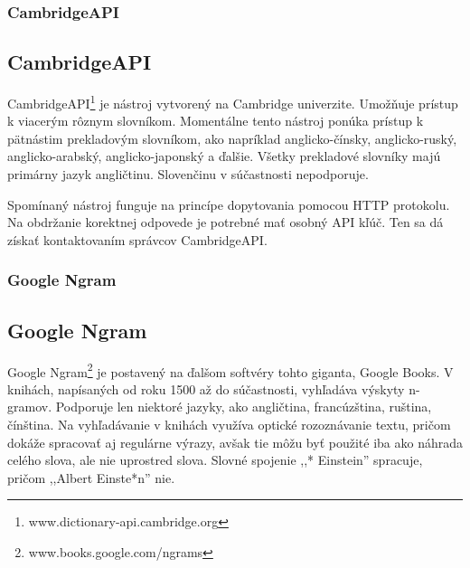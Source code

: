 %
%
{
	\subsubsection{CambridgeAPI}
}
{
	\subsection{CambridgeAPI}
}
\label{subsubsec:cambridgeapi}
CambridgeAPI\footnote{www.dictionary-api.cambridge.org} je nástroj vytvorený na Cambridge univerzite. Umožňuje prístup k viacerým rôznym slovníkom. Momentálne tento nástroj ponúka prístup k pätnástim prekladovým slovníkom, ako napríklad anglicko-čínsky, anglicko-ruský, anglicko-arabský, anglicko-japonský a ďalšie. Všetky prekladové slovníky majú primárny jazyk angličtinu. Slovenčinu v súčastnosti nepodporuje.

Spomínaný nástroj funguje na princípe dopytovania pomocou HTTP protokolu. Na obdržanie korektnej odpovede je potrebné mať osobný API kľúč. Ten sa dá získať kontaktovaním správcov CambridgeAPI.

%
%
{
	\subsubsection{Google Ngram}
}
{
	\subsection{Google Ngram}
}
\label{subsubsec:googlengram}
Google Ngram\footnote{www.books.google.com/ngrams} je postavený na ďalšom softvéry tohto giganta, Google Books. V knihách,  napísaných od roku 1500 až do súčastnosti, vyhľadáva výskyty n-gramov. Podporuje len niektoré jazyky, ako angličtina, francúzština, ruština, čínština. Na vyhľadávanie v knihách využíva optické rozoznávanie textu, pričom dokáže spracovať aj regulárne výrazy, avšak tie môžu byť použité iba ako náhrada celého slova, ale nie uprostred slova. Slovné spojenie ,,* Einstein'' spracuje, pričom ,,Albert Einste*n'' nie.

